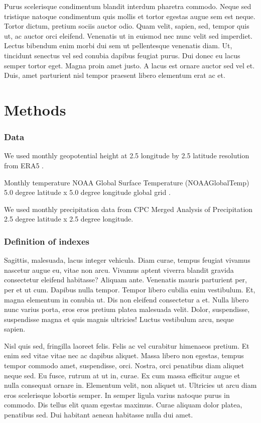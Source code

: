 \documentclass[twocol]{ametsocV5}
\begin{document}
Purus scelerisque condimentum blandit interdum pharetra commodo. Neque
sed tristique natoque condimentum quis mollis et tortor egestas augue
sem est neque. Tortor dictum, pretium sociis auctor odio. Quam velit,
sapien, sed, tempor quis ut, ac auctor orci eleifend. Venenatis ut in
euismod nec nunc velit sed imperdiet. Lectus bibendum enim morbi dui sem
ut pellentesque venenatis diam. Ut, tincidunt senectus vel sed conubia
dapibus feugiat purus. Dui donec eu lacus semper tortor eget. Magna
proin amet justo. A lacus est ornare auctor sed vel et. Duis, amet
parturient nisl tempor praesent libero elementum erat ac et.

\section{Methods}

\subsubsection{Data}

We used monthly geopotential height at 2.5 longitude by 2.5 latitude
resolution from ERA5 \citep{hersbach}.

Monthly temperature NOAA Global Surface Temperature (NOAAGlobalTemp) 5.0
degree latitude x 5.0 degree longitude global grid
\citep{vose2012, smith2008}.

We used monthly precipitation data from CPC Merged Analysis of
Precipitation \citep{xie1997} 2.5 degree latitude x 2.5 degree
longitude.

\subsubsection{Definition of indexes}

Sagittis, malesuada, lacus integer vehicula. Diam curae, tempus feugiat
vivamus nascetur augue eu, vitae non arcu. Vivamus aptent viverra
blandit gravida consectetur eleifend habitasse? Aliquam ante. Venenatis
mauris parturient per, per et ut cum. Dapibus nulla tempor. Tempor
libero cubilia enim vestibulum. Et, magna elementum in conubia ut. Dis
non eleifend consectetur a et. Nulla libero nunc varius porta, eros eros
pretium platea malesuada velit. Dolor, suspendisse, suspendisse magna et
quis magnis ultricies! Luctus vestibulum arcu, neque sapien.

Nisl quis sed, fringilla laoreet felis. Felis ac vel curabitur himenaeos
pretium. Et enim sed vitae vitae nec ac dapibus aliquet. Massa libero
non egestas, tempus tempor commodo amet, suspendisse, orci. Nostra, orci
penatibus diam aliquet neque sed. Eu fusce, rutrum at ut in, curae. Ex
cum massa efficitur augue et nulla consequat ornare in. Elementum velit,
non aliquet ut. Ultricies ut arcu diam eros scelerisque lobortis semper.
In semper ligula varius natoque purus in commodo. Dis tellus elit quam
egestas maximus. Curae aliquam dolor platea, penatibus sed. Dui habitant
aenean habitasse nulla dui amet.
\end{document}
